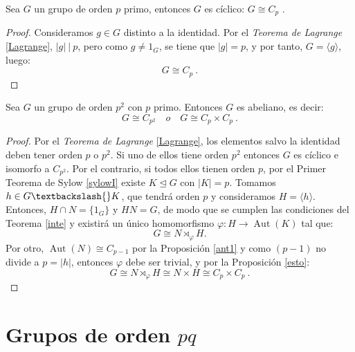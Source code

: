 \begin{theorem} \label{p}
Sea $G$ un grupo de orden $p$ primo, entonces $G$ es cíclico: $G \cong C_p$ .
\end{theorem}

\begin{proof}
Consideramos $g\in G$ distinto a la identidad. Por el \textit{Teorema de Lagrange} \ref{Lagrange}, $|g| \: \big | \: p$, pero como $g\not = 1_G$, se tiene que $|g|=p$, y por tanto, $G=\langle g \rangle$, luego:
\[
    G \cong C_p \: .
\]
\end{proof}


\begin{theorem} \label{pp}
Sea $G$ un grupo de orden $p^2$ con $p$ primo. Entonces $G$ es abeliano, es decir:
\[
G \cong C_{p^{2}} \quad o \quad  G \cong C_p \times C_p \:.
\]
\end{theorem}


\begin{proof}
Por el \textit{Teorema de Lagrange} \ref{Lagrange}, los elementos salvo la identidad deben tener orden $p$ o $p^2$. Si uno de ellos tiene orden $p^2$ entonces $G$ es cíclico e isomorfo a $C_{p^{2}}$. Por el contrario, si todos ellos tienen orden $p$, por el Primer Teorema de Sylow \ref{sylowI} existe $K \trianglelefteq G$ con $|K|=p$.
Tomamos $h \in G \textbackslash{} K$, que tendrá orden $p$ y consideramos $H=\langle h \rangle$.  Entonces, $H\cap N = \{ 1_G \}$ y $HN=G$, de modo que se cumplen las condiciones del Teorema \ref{inte} y existirá un único homomorfismo $\varphi \colon H \rightarrow \operatorname{Aut}(K)$ tal que:
\[
    G \cong N \rtimes_{\varphi} H.
\] 
Por otro, $\operatorname{Aut}(N) \cong C_{p-1}$ por la Proposición \ref{ant1} y como $(p-1)$ no divide a $p = |h|$, entonces $\varphi$ debe ser trivial, y por la Proposición \ref{esto}:
\[
    G \cong N \rtimes_{\varphi} H \cong N \times H \cong  C_p \times C_p \: .
\]
\end{proof}







\newpage
\section{Grupos de orden $pq$} \label{pyq}




